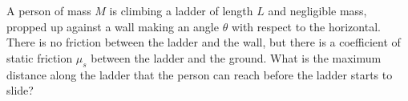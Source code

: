 A person of mass $M$ is climbing a ladder of length $L$ and
negligible mass, propped up against a wall making an angle $\theta$
with respect to the horizontal. There is no friction between the
ladder and the wall, but there is a coefficient of static friction
$\mu_s$ between the ladder and the ground. What is the maximum
distance along the ladder that the person can reach before the ladder
starts to slide?
